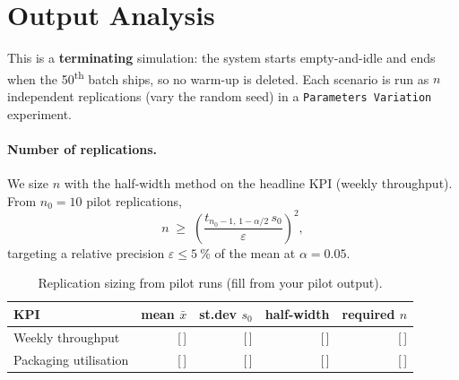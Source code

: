 \section{Output Analysis}
\label{sec:output}

This is a \textbf{terminating} simulation: the system starts empty-and-idle and
ends when the 50\textsuperscript{th} batch ships, so no warm-up is deleted.
Each scenario is run as $n$ independent replications (vary the random seed) in a
\texttt{Parameters Variation} experiment.

\paragraph{Number of replications.} We size $n$ with the half-width method on
the headline KPI (weekly throughput). From $n_0=10$ pilot replications,
\begin{equation}
  n \;\ge\; \left(\frac{t_{n_0-1,\,1-\alpha/2}\,s_0}{\varepsilon}\right)^{\!2},
  \label{eq:halfwidth}
\end{equation}
targeting a relative precision $\varepsilon \le \SI{5}{\percent}$ of the mean at
$\alpha=0.05$.

\begin{table}[H]
\centering
\caption{Replication sizing from pilot runs (fill from your pilot output).}
\label{tab:reps}
\begin{tabularx}{\textwidth}{X r r r r}
\toprule
KPI & mean $\bar x$ & st.dev $s_0$ & half-width & required $n$ \\
\midrule
Weekly throughput & [\,] & [\,] & [\,] & [\,] \\
Packaging utilisation & [\,] & [\,] & [\,] & [\,] \\
\bottomrule
\end{tabularx}
\end{table}
